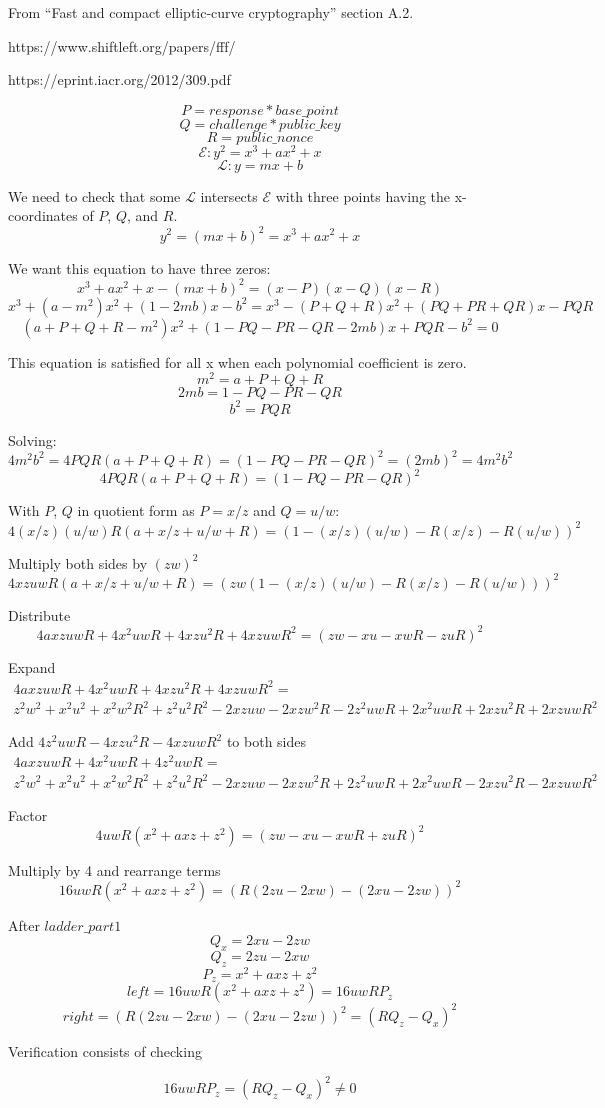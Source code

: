 \documentclass[fleqn]{amsart}
\begin{document}
\setlength{\parindent}{0pt}
\setlength{\mathindent}{0pt}

From ``Fast and compact elliptic-curve cryptography'' section A.2.

https://www.shiftleft.org/papers/fff/

https://eprint.iacr.org/2012/309.pdf

$$P = response*base\_point$$
$$Q = challenge*public\_key$$
$$R = public\_nonce$$
$$\mathcal{E}: y^2 = x^3 + ax^2 + x$$
$$\mathcal{L}: y = mx + b$$

We need to check that some $\mathcal{L}$ intersects $\mathcal{E}$ with three points having the x-coordinates of $P$, $Q$, and $R$.
$$y^2 = (mx + b)^2 = x^3 + ax^2 + x$$

We want this equation to have three zeros:
$$x^3 + ax^2 + x - (mx + b)^2 = (x - P)(x - Q)(x - R)$$
$$x^3 + (a - m^2)x^2 + (1 - 2mb)x - b^2 =
x^3 - (P + Q + R)x^2 + (PQ + PR + QR)x - PQR$$
$$(a + P + Q + R - m^2)x^2 + (1 - PQ - PR - QR - 2mb)x + PQR - b^2 = 0$$

This equation is satisfied for all x when each polynomial
coefficient is zero.
$$m^2 = a + P + Q + R$$
$$2mb = 1 - PQ - PR - QR$$
$$b^2 = PQR$$

Solving:
$$4m^2b^2 = 4PQR(a + P + Q + R) = (1 - PQ - PR - QR)^2 = (2mb)^2 = 4m^2b^2$$
$$4PQR(a + P + Q + R) = (1 - PQ - PR - QR)^2$$

With $P$, $Q$ in quotient form as $P = x/z$ and $Q = u/w$:
$$4(x/z)(u/w)R(a + x/z + u/w + R) = (1 - (x/z)(u/w) - R(x/z) - R(u/w))^2$$

Multiply both sides by $(zw)^2$
$$4xzuwR(a + x/z + u/w + R) = (zw(1 - (x/z)(u/w) - R(x/z) - R(u/w)))^2$$

Distribute
$$4axzuwR + 4x^2uwR + 4xzu^2R + 4xzuwR^2 = (zw - xu - xwR - zuR)^2$$

Expand
\begin{multline*}
4axzuwR + 4x^2uwR + 4xzu^2R + 4xzuwR^2 = \\
z^2w^2 + x^2u^2 + x^2w^2R^2 + z^2u^2R^2 - 2xzuw - 2xzw^2R - 2z^2uwR + 2x^2uwR + 2xzu^2R + 2xzuwR^2
\end{multline*}

Add $4z^2uwR - 4xzu^2R - 4xzuwR^2$ to both sides
\begin{multline*}
4axzuwR + 4x^2uwR + 4z^2uwR = \\
z^2w^2 + x^2u^2 + x^2w^2R^2 + z^2u^2R^2 - 2xzuw - 2xzw^2R + 2z^2uwR + 2x^2uwR - 2xzu^2R - 2xzuwR^2
\end{multline*}

Factor
$$4uwR(x^2 + axz + z^2) = (zw - xu - xwR + zuR)^2$$

Multiply by 4 and rearrange terms
$$16uwR(x^2 + axz + z^2) = (R(2zu - 2xw) - (2xu - 2zw))^2$$

After $ladder\_part1$
$$Q_x = 2xu - 2zw$$
$$Q_z = 2zu - 2xw$$
$$P_z = x^2 + axz + z^2$$
$$left = 16uwR(x^2 + axz + z^2) = 16uwRP_z$$
$$right = (R(2zu - 2xw) - (2xu - 2zw))^2 = (RQ_z - Q_x)^2$$

Verification consists of checking

$$16uwRP_z = (RQ_z - Q_x)^2 \neq 0$$
\end{document}

